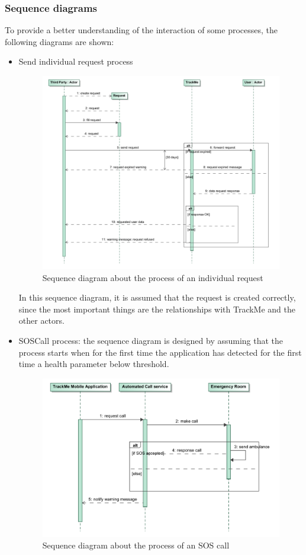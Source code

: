 \subsubsection{Sequence diagrams}
To provide a better understanding of the interaction of some processes, the following diagrams are shown:
\begin{itemize}
\item Send individual request process
\begin{figure}[H]
\includegraphics[width=\linewidth]{Images/requestsequence}
\caption{Sequence diagram about the process of an individual request }
\label{fig:sequencediagram1}
\end{figure}
In this sequence diagram, it is assumed that the request is created correctly, since the most important things are the relationships with TrackMe and the other actors.

\item SOSCall process: the sequence diagram is designed by assuming that the process starts when for the first time the application has detected for the first time a health parameter below threshold.
\begin{figure}[H]
\includegraphics[width=\linewidth]{Images/callsequence}
\caption{Sequence diagram about the process of an SOS call }
\label{fig:sequencediagram2}
\end{figure}

\end{itemize}